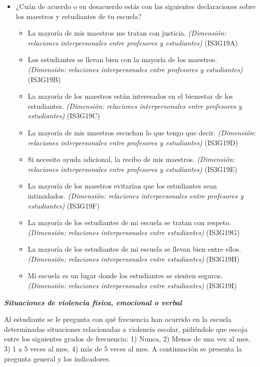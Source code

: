 \documentclass[12pt,twoside]{templates/facsothesis}
\providecommand{\tightlist}{%
  \setlength{\itemsep}{0pt}\setlength{\parskip}{0pt}}
\begin{document}
\begin{itemize}
\item
  ¿Cuán de acuerdo o en desacuerdo estás con las siguientes declaraciones sobre los maestros y estudiantes de tu escuela?

  \begin{itemize}
  \tightlist
  \item
    La mayoría de mis maestros me tratan con justicia. \emph{(Dimensión: relaciones interpersonales entre profesores y estudiantes)} (IS3G19A)
  \item
    Los estudiantes se llevan bien con la mayoría de los maestros. \emph{(Dimensión: relaciones interpersonales entre profesores y estudiantes)} (IS3G19B)
  \item
    La mayoría de los maestros están interesados en el bienestar de los estudiantes. \emph{(Dimensión: relaciones interpersonales entre profesores y estudiantes)} (IS3G19C)
  \item
    La mayoría de mis maestros escuchan lo que tengo que decir. \emph{(Dimensión: relaciones interpersonales entre profesores y estudiantes)} (IS3G19D)
  \item
    Si necesito ayuda adicional, la recibo de mis maestros. \emph{(Dimensión: relaciones interpersonales entre profesores y estudiantes)} (IS3G19E)
  \item
    La mayoría de los maestros evitarían que los estudiantes sean intimidados. \emph{(Dimensión: relaciones interpersonales entre profesores y estudiantes)} (IS3G19F)
  \item
    La mayoría de los estudiantes de mi escuela se tratan con respeto. \emph{(Dimensión: relaciones interpersonales entre estudiantes)} (IS3G19G)
  \item
    La mayoría de los estudiantes de mi escuela se llevan bien entre ellos. \emph{(Dimensión: relaciones interpersonales entre estudiantes)} (IS3G19H)
  \item
    Mi escuela es un lugar donde los estudiantes se sienten seguros. \emph{(Dimensión: relaciones interpersonales entre estudiantes)} (IS3G19I)
  \end{itemize}
\end{itemize}

\textbf{\emph{Situaciones de violencia física, emocional o verbal}}

Al estudiante se le pregunta con qué frecuencia han ocurrido en la escuela determinadas situaciones relacionadas a violencia escolar, pidiéndole que escoja entre los siguientes grados de frecuencia: 1) Nunca, 2) Menos de una vez al mes, 3) 1 a 5 veces al mes, 4) más de 5 veces al mes. A continuación se presenta la pregunta general y los indicadores.
\end{document}
